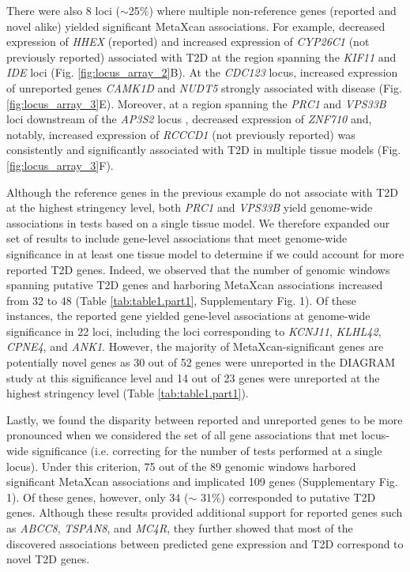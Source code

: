 \documentclass[10pt]{article}
\begin{document}
There were also 8 loci ($\sim$25\%) where multiple non-reference genes (reported and novel alike) yielded significant MetaXcan associations. For example, decreased expression of \textit{HHEX} (reported) and increased expression of \textit{CYP26C1} (not previously reported) associated with T2D at the region spanning the \textit{KIF11} and \textit{IDE} loci (Fig. \ref{fig:locus_array_2}B). At the \textit{CDC123} locus, increased expression of unreported genes \textit{CAMK1D} and \textit{NUDT5} strongly associated with disease (Fig. \ref{fig:locus_array_3}E). Moreover, at a region spanning the \textit{PRC1} and \textit{VPS33B} loci downstream of the \textit{AP3S2} locus , decreased expression of \textit{ZNF710} and, notably, increased expression of \textit{RCCCD1} (not previously reported) was consistently and significantly associated with T2D in multiple tissue models (Fig. \ref{fig:locus_array_3}F). 

Although the reference genes in the previous example do not associate with T2D at the highest stringency level, both \textit{PRC1} and \textit{VPS33B} yield genome-wide associations in tests based on a single tissue model. We therefore expanded our set of results to include gene-level associations that meet genome-wide significance in at least one tissue model to determine if we could account for more reported T2D genes. Indeed, we observed that the number of genomic windows spanning putative T2D genes and harboring MetaXcan associations increased from 32 to 48 (Table \ref{tab:table1.part1}, Supplementary Fig. 1). Of these instances, the reported gene yielded gene-level associations at genome-wide significance in 22 loci, including the loci corresponding to \textit{KCNJ11}, \textit{KLHL42}, \textit{CPNE4}, and \textit{ANK1}. However, the majority of MetaXcan-significant genes are potentially novel genes as 30 out of 52 genes were unreported in the DIAGRAM study at this significance level and 14 out of 23 genes were unreported at the highest stringency level (Table \ref{tab:table1.part1}).

Lastly, we found the disparity between reported and unreported genes to be more pronounced when we considered the set of all gene associations that met locus-wide significance (i.e. correcting for the number of tests performed at a single locus). Under this criterion, 75 out of the 89 genomic windows harbored significant MetaXcan associations and implicated 109 genes (Supplementary Fig. 1). Of these genes, however, only 34 ($\sim$ 31\%) corresponded to putative T2D genes. Although these results provided additional support for reported genes such as \textit{ABCC8}, \textit{TSPAN8}, and \textit{MC4R}, they further showed that most of the discovered associations between predicted gene expression and T2D correspond to novel T2D genes.   
\end{document}
